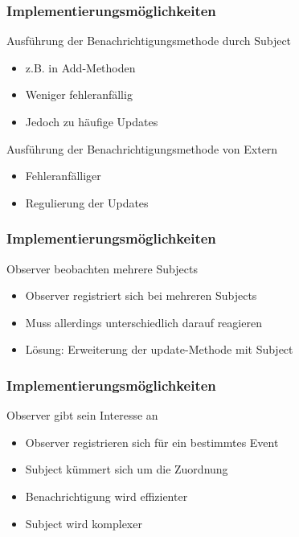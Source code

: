 \begin{frame}
\frametitle{Implementierungsmöglichkeiten}
		\begin{block}{Ausführung der Benachrichtigungsmethode durch Subject}
  		 \begin{itemize}
  		 	\item z.B. in Add-Methoden
		  	\item Weniger fehleranfällig
		  	\item Jedoch zu häufige Updates
		  \end{itemize}  
  		\end{block}		
  		\begin{block}{Ausführung der Benachrichtigungsmethode von Extern}
		  \begin{itemize}
		  	\item Fehleranfälliger
		  	\item Regulierung der Updates
		  \end{itemize}
  		\end{block}	
\end{frame}

\begin{frame}
\frametitle{Implementierungsmöglichkeiten}
		  \begin{block}{Observer beobachten mehrere Subjects}
		  	\begin{itemize}
		  		\item Observer registriert sich bei mehreren Subjects
		  		\item Muss allerdings unterschiedlich darauf reagieren
		  		\item Lösung: Erweiterung der update-Methode mit Subject
		  	\end{itemize}
		  \end{block}
\end{frame}

\begin{frame}
\frametitle{Implementierungsmöglichkeiten}
		\begin{block}{Observer gibt sein Interesse an}
  		 \begin{itemize}
		  	\item Observer registrieren sich für ein bestimmtes Event
		  	\item Subject kümmert sich um die Zuordnung
		  	\item Benachrichtigung wird effizienter
		  	\item Subject wird komplexer
		  \end{itemize}  
  		\end{block}		
\end{frame}

